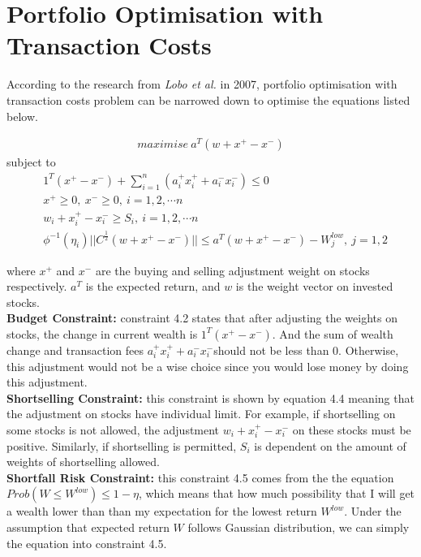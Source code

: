 \documentclass[paper=a4, fontsize=11pt]{article} %
\numberwithin{equation}{section} %
\numberwithin{figure}{section} %
\numberwithin{table}{section} %
\begin{document}
\newpage
\section{Portfolio Optimisation with Transaction Costs}

According to the research from \textit{Lobo et al.} in 2007, portfolio optimisation with transaction costs problem can be narrowed down to optimise the equations listed below. 

\begin{align}
maximise\ a^{T}(w+x^{+}-x^{-})
\end{align}
subject to
\begin{align}
&1^{T}(x^{+}-x^{-})+\sum_{i=1}^{n}(a_{i}^{+}x_{i}^{+}+a_{i}^{-}x_{i}^{-}) \leqslant 0\\
&x^{+}\geqslant 0,\ x^{-}\geqslant 0,\ i=1,2,\cdots n\\
&w_{i}+x_{i}^{+}-x_{i}^{-}\geqslant S_{i}, \ i=1,2,\cdots n\\
&\phi ^{-1}(\eta _{i})||C^{\frac{1}{2}}(w+x^{+}-x^{-})||\leqslant a^{T}(w+x^{+}-x^{-})-W_{j}^{low}, \ j=1,2
\end{align}

where $x^{+}$ and $x^{-}$ are the buying and selling adjustment weight on stocks respectively. $a^{T}$ is the expected return, and $w$ is the weight vector on invested stocks.\\ 
\textbf{Budget Constraint: } constraint 4.2 states that after adjusting the weights on stocks, the change in current wealth is $\mathit{1^{T}(x^{+}-x^{-})}$. And the sum of wealth change and transaction fees $\mathit{a_{i}^{+}x_{i}^{+}+a_{i}^{-}x_{i}^{-}}$should not be less than 0. Otherwise, this adjustment would not be a wise choice since you would lose money by doing this adjustment.\\
\textbf{Shortselling Constraint: } this constraint is shown by equation 4.4 meaning that the adjustment on stocks have individual limit. For example, if shortselling on some stocks is not allowed, the adjustment $\mathit{w_{i}+x_{i}^{+}-x_{i}^{-}}$ on these stocks must be positive. Similarly, if shortselling is permitted, $S_{i}$ is dependent on the amount of weights of shortselling allowed.\\
\textbf{Shortfall Risk Constraint: } this constraint 4.5 comes from the the equation $Prob(W\leqslant  W^{low})\leqslant 1-\eta $, which means that how much possibility that I will get a wealth lower than than my expectation for the lowest return $W^{low}$. Under the assumption that expected return $W$ follows Gaussian distribution, we can simply the equation into constraint 4.5.\\



\end{document}
